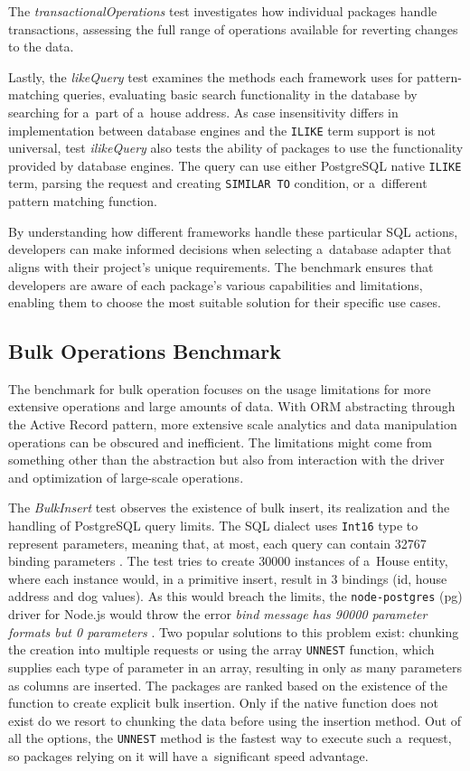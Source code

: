 The \textit{transactionalOperations} test investigates how individual packages
handle transactions, assessing the full range of operations available for
reverting changes to the data.

Lastly, the \textit{likeQuery} test examines the methods each framework uses for
pattern-matching queries, evaluating basic search functionality in the database
by searching for a~part of a~house address. As case insensitivity differs in
implementation between database engines and the \texttt{ILIKE} term support is
not universal, test \textit{ilikeQuery} also tests the ability of packages to
use the functionality provided by database engines. The query can use either
PostgreSQL native \texttt{ILIKE} term, parsing the request and creating
\texttt{SIMILAR TO} condition, or a~different pattern matching function. 

By understanding how different frameworks handle these particular SQL actions,
developers can make informed decisions when selecting a~database adapter that
aligns with their project's unique requirements. The benchmark ensures that
developers are aware of each package's various capabilities and limitations,
enabling them to choose the most suitable solution for their specific use cases.

\subsection*{Bulk Operations Benchmark}
The benchmark for bulk operation focuses on the usage limitations for more
extensive operations and large amounts of data. With ORM abstracting through the
Active Record pattern, more extensive scale analytics and data manipulation
operations can be obscured and inefficient. The limitations might come from
something other than the abstraction but also from interaction with the driver
and optimization of large-scale operations.

The \textit{BulkInsert} test observes the existence of bulk insert, its
realization and the handling of PostgreSQL query limits. The SQL dialect uses
\texttt{Int16} type to represent parameters, meaning that, at most, each query
can contain 32767 binding parameters \cite{postgresMessageFormats}. The test
tries to create 30000 instances of a~House entity, where each instance would, in
a primitive insert, result in 3 bindings (id, house address and dog values). As
this would breach the limits, the \texttt{node-postgres} (pg) driver for Node.js
would throw the error \textit{bind message has 90000 parameter formats but 0
parameters} \cite{nodePostgresParameterLimit}. Two popular solutions to this
problem exist: chunking the creation into multiple requests or using the array
\texttt{UNNEST} function, which supplies each type of parameter in an array,
resulting in only as many parameters as columns are inserted. The packages are
ranked based on the existence of the function to create explicit bulk insertion.
Only if the native function does not exist do we resort to chunking the data
before using the insertion method. Out of all the options, the \texttt{UNNEST}
method is the fastest way to execute such a~request, so packages relying on it
will have a~significant speed advantage.

